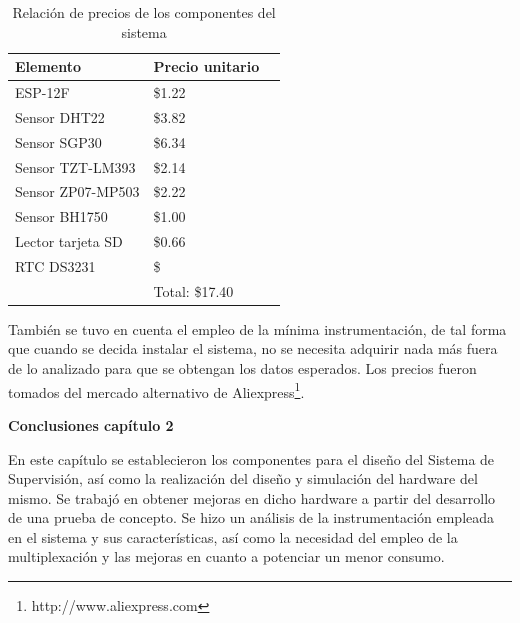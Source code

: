 \begin{table}[H]
    \centering
    \caption{Relación de precios de los componentes del sistema}
    \label{tab:precios_componentes}
    \begin{tabular}{|l|l|r|}
    \hline
    \cellcolor[HTML]{9698ED}Elemento    & \cellcolor[HTML]{9698ED}Precio unitario  \\ \hline
    ESP-12F                             & \$1.22                                   \\ \hline
    Sensor DHT22                        & \$3.82                                   \\ \hline
    Sensor SGP30                        & \$6.34                                   \\ \hline
    Sensor TZT-LM393                    & \$2.14                                   \\ \hline
    Sensor ZP07-MP503                   & \$2.22                                   \\ \hline
    Sensor BH1750                       & \$1.00                                   \\ \hline
    Lector tarjeta SD                   & \$0.66                                   \\ \hline
    RTC DS3231                          & \$                                       \\ \hline
                                        & Total: \$17.40                           \\ \hline
    \end{tabular}
\end{table}

También se tuvo en cuenta el empleo de la mínima instrumentación, de tal forma que cuando se decida instalar el sistema, no se necesita adquirir nada más fuera de lo analizado para que se obtengan los datos esperados.
Los precios fueron tomados del mercado alternativo de Aliexpress\footnote{http://www.aliexpress.com}.\\

        \textbf{\Large Conclusiones capítulo 2}\vspace{0.5cm}

        En este capítulo se establecieron los componentes para el diseño del Sistema de Supervisión, así como la realización del diseño y simulación del hardware del mismo.
        Se trabajó en obtener mejoras en dicho hardware a partir del desarrollo de una prueba de concepto.
        Se hizo un análisis de la instrumentación empleada en el sistema y sus características, así como la necesidad del empleo de la multiplexación y las mejoras en cuanto a potenciar un menor consumo.
